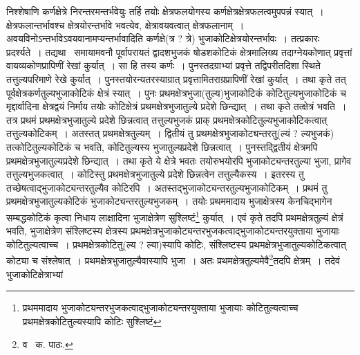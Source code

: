 \documentclass[11pt, openany]{book}
\begin{document}
\noindent निश्शेषाणि कर्णक्षेत्रे निरन्तरमन्तर्भवेयुः तर्हि तयोः क्षेत्रफलयोगस्य कर्णक्षेत्रक्षेत्रफलत्वमुपपन्नं स्यात्~। क्षेत्रफलान्तर्भावश्च क्षेत्रयोरन्तर्भावे
भवत्येव, क्षेत्रावयवत्वात् क्षेत्रफलानाम्~। अवयविनोऽन्तर्भावेऽवयवानामप्यन्तर्भावादिति कर्णक्षे(त्र ? त्रे) भुजाकोटिक्षेत्रयोरन्तर्भावः~। तत्प्रकारः
प्रदर्श्यते~। तद्यथा \textendash\ समायामवनौ पूर्वापरायतं द्वादशभुजकं षोडशकोटिकं क्षेत्रमालिख्य तदाग्नेयकोणात् प्रवृत्तां वायव्यकोणप्रापिणीं रेखां कुर्यात्~। सा हि तस्य कर्णः~। पुनस्तदग्राभ्यां प्रवृत्ते तद्विपरीतदिशा स्थिते तत्तुल्यपरिमाणे रेखे कुर्यात्~। पुनस्तयोरन्यतरस्याग्रात् प्रवृत्तामितराग्रप्रापिणीं रेखां कुर्यात्~। तथा कृते तत् पूर्वक्षेत्रकर्णतुल्यभुजाकोटिकं क्षेत्रं स्यात्~। पुनः प्रथमक्षेत्रभुजा(तुल्य)भुजाकोटिकं कोटितुल्यभुजाकोटिकं च मृद्दार्वादिना क्षेत्रद्वयं निर्माय तयोः कोटिक्षेत्रं प्रथमक्षेत्रभुजातुल्ये प्रदेशे छिन्द्यात्~। तथा कृते तत्क्षेत्रं भवति~। तत्र प्रथमं प्रथमक्षेत्रभुजातुल्ये प्रदेशे छिन्नत्वात् तत्तुल्यभुजकं प्राक् प्रथमक्षेत्रकोटितुल्यभुजाकोटिकत्वात् तत्तुल्यकोटिकम्~। अतस्तत् प्रथमक्षेत्रतुल्यम्~। द्वितीयं तु प्रथमक्षेत्रभुजाकोट्यन्तरतु(ल्यं ? ल्यभुजकं) तत्कोटितुल्यकोटिकं च भवति, कोटितुल्यस्य भुजातुल्यप्रदेशे छिन्नत्वात्~। पुनस्तद्द्वितीयं क्षेत्रमपि प्रथमक्षेत्रभुजातुल्यप्रदेशे छिन्द्यात्~। तथा कृते ये क्षेत्रे भवतः तयोरुभयोरपि भुजाकोट्यन्तरतुल्या भुजा, प्रागेव तत्तुल्यभुजकत्वात्~। कोटिस्तु प्रथमक्षेत्रभुजातुल्ये प्रदेशे छिन्नत्वेन तत्तुल्यैकस्य~। इतरस्य तु तच्छेषत्वाद्भुजाकोट्यन्तरतुल्यैव कोटिरपि~। अतस्तद्भुजाकोट्यन्तरतुल्यभुजाकोटिकम्~। प्रथमं तु प्रथमक्षेत्रभुजातुल्यकोटिकं भुजाकोट्यन्तरतुल्यभुजकम्~। तयोः प्रथममादाय भुजाक्षेत्रस्य केनचिद्भागेन सम्बद्धकोटिकं कृत्वा निधाय लाक्षादिना भुजाक्षेत्रेण सुश्लिष्टं\renewcommand{\thefootnote}{१}\footnote{प्रथममादाय भुजाकोट्यन्तरभुजकत्वाद्भुजाकोट्यन्तरयुक्ताया भुजायाः कोटितुल्यत्वाच्च प्रथमक्षेत्रकोटितुल्यस्यापि कोटिः सुश्लिष्टं} कुर्यात्~। एवं कृते तदपि प्रथमक्षेत्रतुल्यं क्षेत्रं भवति, भुजाक्षेत्रेण संश्लिष्टस्य क्षेत्रस्य प्रथमक्षेत्रभुजाकोट्यन्तरभुजकत्वाद्भुजाकोट्यन्तरयुक्ताया भुजायाः कोटितुल्यत्वाच्च~। प्रथमक्षेत्रकोटितु(ल्य ? ल्या)स्यापि कोटिः, संश्लिष्टस्य प्रथमक्षेत्रभुजातुल्यकोटिकत्वात् कोट्या च संश्लेषात्~। प्रथमक्षेत्रभुजातुल्यैवास्यापि भुजा~। अतः प्रथमक्षेत्रतुल्यमेवै\renewcommand{\thefootnote}{२}\footnote{व \textendash\ क. पाठः.}तदपि क्षेत्रम्~। तदेवं भुजाकोटिक्षेत्राभ्यां

\newpage
\end{document}
